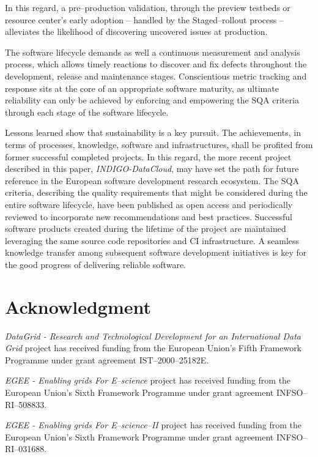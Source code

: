 In this regard, a pre--production validation,
through the preview testbeds or resource center's early adoption -- handled by the
Staged--rollout process -- alleviates the likelihood of discovering uncovered
issues at production.

The software lifecycle demands as well a continuous measurement and analysis
process, which allows timely reactions to discover and fix defects throughout the
development, release and maintenance stages. Conscientious metric
tracking and response sits at the core of an appropriate software maturity, as
ultimate reliability can only be achieved by enforcing and empowering the SQA
criteria through each stage of the software lifecycle.

Lessons learned show that sustainability is a key pursuit. The achievements, in terms of
processes, knowledge, software and infrastructures, shall be profited from former successful
completed projects. In this regard, the more recent project described in this paper, {\sl INDIGO-DataCloud},
may have set the path for future reference in the European software development research ecosystem.
The SQA criteria, describing the quality requirements that might be considered during the entire
software lifecycle, have been published as open access and periodically reviewed to incorporate
new recommendations and best practices. Successful software products created during the lifetime of the
project are maintained leveraging the same source code repositories and CI infrastructure. A seamless
knowledge transfer among subsequent software development initiatives is key for the good progress of
delivering reliable software.




\section*{Acknowledgment}

{\sl DataGrid - Research and Technological Development for an International Data Grid}
project has received funding from the European Union's Fifth Framework Programme under
grant agreement IST--2000--25182E.

{\sl EGEE - Enabling grids For E--science} project has received funding from the European
Union's Sixth Framework Programme under grant agreement INFSO--RI--508833.

{\sl EGEE - Enabling grids For E--science--II} project has received funding from the
European Union's Sixth Framework Programme under grant agreement INFSO--RI--031688.

